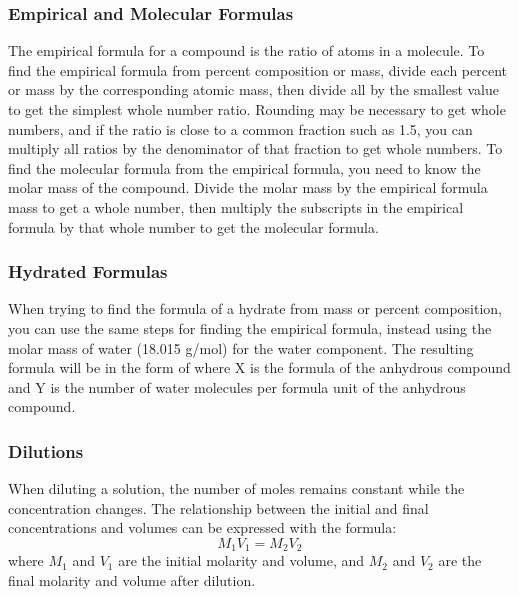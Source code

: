         \subsubsection{Empirical and Molecular Formulas}
        The empirical formula for a compound is the ratio of atoms in a molecule. To find the empirical formula from percent composition or mass, divide each percent or mass by the corresponding atomic mass, then divide all by the smallest value to get the simplest whole number ratio. Rounding may be necessary to get whole numbers, and if the ratio is close to a common fraction such as 1.5, you can multiply all ratios by the denominator of that fraction to get whole numbers.
        To find the molecular formula from the empirical formula, you need to know the molar mass of the compound. Divide the molar mass by the empirical formula mass to get a whole number, then multiply the subscripts in the empirical formula by that whole number to get the molecular formula.
        \subsubsection{Hydrated Formulas}
        When trying to find the formula of a hydrate from mass or percent composition, you can use the same steps for finding the empirical formula, instead using the molar mass of water (18.015 g/mol) for the water component. The resulting formula will be in the form of  where X is the formula of the anhydrous compound and Y is the number of water molecules per formula unit of the anhydrous compound.
        \subsubsection{Dilutions}
        When diluting a solution, the number of moles remains constant while the concentration changes. The relationship between the initial and final concentrations and volumes can be expressed with the formula:
        \begin{equation}\label{eq:dilution}
            M_1V_1 = M_2V_2
        \end{equation}
        where $M_1$ and $V_1$ are the initial molarity and volume, and $M_2$ and $V_2$ are the final molarity and volume after dilution.